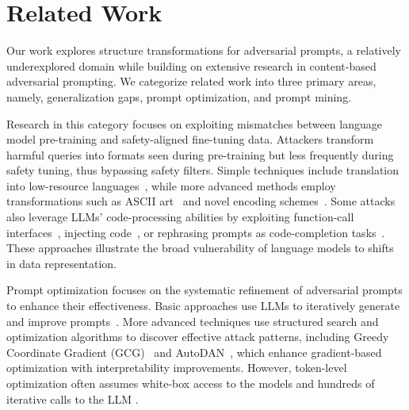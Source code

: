 \section{Related Work}
\label{sec:related_work}
Our work explores structure transformations for adversarial prompts, a relatively underexplored domain while building on extensive research in content-based adversarial prompting. We categorize related work into three primary areas, namely, generalization gaps, prompt optimization, and prompt mining.

 Research in this category focuses on exploiting mismatches between language model pre-training and safety-aligned fine-tuning data. Attackers transform harmful queries into formats seen during pre-training but less frequently during safety tuning, thus bypassing safety filters. Simple techniques include translation into low-resource languages~\cite{deng2024multilingual}, while more advanced methods employ transformations such as ASCII art~\cite{jiang2024artprompt} and novel encoding schemes~\cite{Handa2024WhenCompetencyinRO}. Some attacks also leverage LLMs' code-processing abilities by exploiting function-call interfaces~\cite{wu2024dark}, injecting code~\cite{kang2024exploiting}, or rephrasing prompts as code-completion tasks~\cite{lv2024codechameleon}. These approaches illustrate the broad vulnerability of language models to shifts in data representation.

 Prompt optimization focuses on the systematic refinement of adversarial prompts to enhance their effectiveness. Basic approaches use LLMs to iteratively generate and improve prompts~\cite{chaojailbreaking}.
More advanced techniques use structured search and optimization algorithms to discover effective attack patterns, including Greedy Coordinate Gradient (GCG)~\cite{zou2023universal} and AutoDAN~\cite{liu2023autodan}, which enhance gradient-based optimization with interpretability improvements.
However, token-level optimization often assumes white-box access to the models and hundreds of iterative calls to the LLM \cite{liao2024amplegcg,jones2023automatically}.


